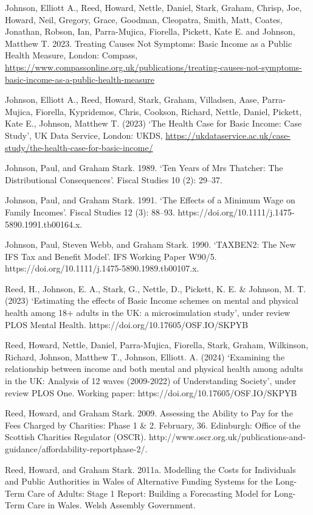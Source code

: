 \documentclass[
  letterpaper,
  DIV=11,
  numbers=noendperiod]{scrartcl}
\begin{document}
Johnson, Elliott A., Reed, Howard, Nettle, Daniel, Stark, Graham,
Chrisp, Joe, Howard, Neil, Gregory, Grace, Goodman, Cleopatra, Smith,
Matt, Coates, Jonathan, Robson, Ian, Parra-Mujica, Fiorella, Pickett,
Kate E. and Johnson, Matthew T. 2023. Treating Causes Not Symptoms:
Basic Income as a Public Health Measure, London: Compass,
\url{https://www.compassonline.org.uk/publications/treating-causes-not-symptoms-basic-income-as-a-public-health-measure}

Johnson, Elliott A., Reed, Howard, Stark, Graham, Villadsen, Aase,
Parra-Mujica, Fiorella, Kypridemos, Chris, Cookson, Richard, Nettle,
Daniel, Pickett, Kate E., Johnson, Matthew T. (2023) `The Health Case
for Basic Income: Case Study', UK Data Service, London: UKDS,
\url{https://ukdataservice.ac.uk/case-study/the-health-case-for-basic-income/}

Johnson, Paul, and Graham Stark. 1989. `Ten Years of Mrs Thatcher: The
Distributional Consequences'. Fiscal Studies 10 (2): 29--37.

Johnson, Paul, and Graham Stark. 1991. `The Effects of a Minimum Wage on
Family Incomes'. Fiscal Studies 12 (3): 88--93.
https://doi.org/10.1111/j.1475-5890.1991.tb00164.x.

Johnson, Paul, Steven Webb, and Graham Stark. 1990. `TAXBEN2: The New
IFS Tax and Benefit Model'. IFS Working Paper W90/5.
https://doi.org/10.1111/j.1475-5890.1989.tb00107.x.

Reed, H., Johnson, E. A., Stark, G., Nettle, D., Pickett, K. E. \&
Johnson, M. T. (2023) `Estimating the effects of Basic Income schemes on
mental and physical health among 18+ adults in the UK: a microsimulation
study', under review PLOS Mental Health.
https://doi.org/10.17605/OSF.IO/SKPYB

Reed, Howard, Nettle, Daniel, Parra-Mujica, Fiorella, Stark, Graham,
Wilkinson, Richard, Johnson, Matthew T., Johnson, Elliott. A. (2024)
`Examining the relationship between income and both mental and physical
health among adults in the UK: Analysis of 12 waves (2009-2022) of
Understanding Society', under review PLOS One. Working paper:
https://doi.org/10.17605/OSF.IO/SKPYB

Reed, Howard, and Graham Stark. 2009. Assessing the Ability to Pay for
the Fees Charged by Charities: Phase 1 \& 2. February, 36. Edinburgh:
Office of the Scottish Charities Regulator (OSCR).
http://www.oscr.org.uk/publications-and-guidance/affordability-reportphase-2/.

Reed, Howard, and Graham Stark. 2011a. Modelling the Costs for
Individuals and Public Authorities in Wales of Alternative Funding
Systems for the Long-Term Care of Adults: Stage 1 Report: Building a
Forecasting Model for Long-Term Care in Wales. Welsh Assembly
Government.
\end{document}
